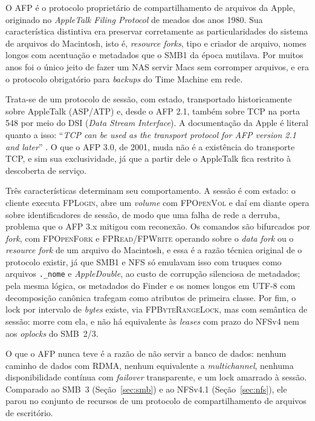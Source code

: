 \documentclass[11pt,a4paper]{article}
\begin{document}
O AFP é o protocolo proprietário de compartilhamento de arquivos da Apple, originado no
\textit{AppleTalk Filing Protocol} de meados dos anos 1980. Sua característica distintiva era
preservar corretamente as particularidades do sistema de arquivos do Macintosh, isto é,
\textit{resource forks}, tipo e criador de arquivo, nomes longos com acentuação e metadados que o
SMB1 da época mutilava. Por muitos anos foi o único jeito de fazer um NAS servir Macs sem corromper
arquivos, e era o protocolo obrigatório para \textit{backups} do Time Machine em rede.

Trata-se de um protocolo de sessão, com estado, transportado historicamente sobre AppleTalk
(ASP/ATP) e, desde o AFP 2.1, também sobre TCP na porta 548 por meio do DSI (\textit{Data Stream
Interface}). A documentação da Apple é literal quanto a isso: ``\textit{TCP can be used as the
transport protocol for AFP version 2.1 and later}'' \cite{appleafptcp}. O que o AFP 3.0, de 2001,
muda não é a existência do transporte TCP, e sim sua exclusividade, já que a partir dele o AppleTalk
fica restrito à descoberta de serviço.

Três características determinam seu comportamento. A sessão é com estado: o cliente executa
\textsc{FPLogin}, abre um \textit{volume} com \textsc{FPOpenVol} e daí em diante opera sobre
identificadores de sessão, de modo que uma falha de rede a derruba, problema que o AFP 3.x mitigou
com reconexão. Os comandos são bifurcados por \textit{fork}, com \textsc{FPOpenFork} e
\textsc{FPRead}/\textsc{FPWrite} operando sobre o \textit{data fork} ou o \textit{resource fork} de
um arquivo do Macintosh, e essa é a razão técnica original de o protocolo existir, já que SMB1 e NFS
só emulavam isso com truques como arquivos \texttt{.\_nome} e \textit{AppleDouble}, ao custo de
corrupção silenciosa de metadados; pela mesma lógica, os metadados do Finder e os nomes longos em
UTF-8 com decomposição canônica trafegam como atributos de primeira classe. Por fim, o lock por
intervalo de \textit{bytes} existe, via \textsc{FPByteRangeLock}, mas com semântica de sessão: morre
com ela, e não há equivalente às \textit{leases} com prazo do NFSv4 nem aos \textit{oplocks} do
SMB~2/3.

O que o AFP nunca teve é a razão de não servir a banco de dados: nenhum caminho de dados com RDMA,
nenhum equivalente a \textit{multichannel}, nenhuma disponibilidade contínua com \textit{failover}
transparente, e um lock amarrado à sessão. Comparado ao SMB~3 (Seção~\ref{sec:smb}) e ao
NFSv4.1 (Seção~\ref{sec:nfs}), ele parou no conjunto de recursos de um protocolo de compartilhamento
de arquivos de escritório.
\end{document}
